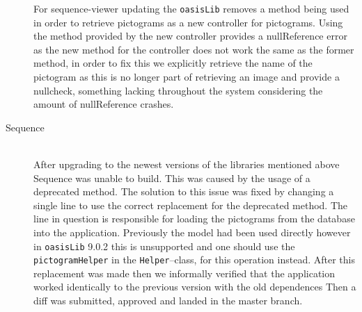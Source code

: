 \begin{description}
    For sequence-viewer updating the \texttt{oasisLib} removes a method being used in order to retrieve pictograms as a new controller for pictograms.
    Using the method provided by the new controller provides a nullReference error as the new method for the controller does not work the same as the former method, in order to fix this we explicitly retrieve the name of the pictogram as this is no longer part of retrieving an image and provide a nullcheck, something lacking throughout the system considering the amount of nullReference crashes.
    \item[Sequence] \hfill \\
    After upgrading to the newest versions of the libraries mentioned above Sequence was unable to build. 
    This was caused by the usage of a deprecated method. 
    The solution to this issue was fixed by changing a single line to use the correct replacement for the deprecated method.
    The line in question is responsible for loading the pictograms from the database into the application. 
    Previously the model had been used directly however in \texttt{oasisLib} 9.0.2 this is unsupported and one should use the \texttt{pictogramHelper} in the \texttt{Helper}--class, for this operation instead.
    After this replacement was made then we informally verified that the application worked identically to the previous version with the old dependences
    Then a diff was submitted, approved and landed in the master branch. 
\end{description}

